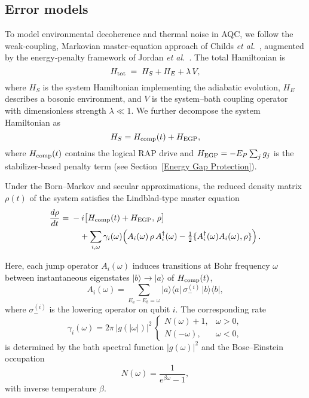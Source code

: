 \documentclass[reprint, amsmath,amssymb,nofootinbib, aps,superscriptaddress,longbibliography]{revtex4-1}
\begin{document}
\subsection{Error models}

To model environmental decoherence and thermal noise in AQC, we follow the weak‐coupling, Markovian master‐equation approach of Childs \emph{et al.}~\cite{childs2001robustness}, augmented by the energy‐penalty framework of Jordan \emph{et al.}~\cite{jordan2006error}.  The total Hamiltonian is  
\begin{equation}
H_{\rm tot} \;=\; H_S + H_E + \lambda\,V,
\end{equation}
where \(H_S\) is the system Hamiltonian implementing the adiabatic evolution, \(H_E\) describes a bosonic environment, and \(V\) is the system–bath coupling operator with dimensionless strength \(\lambda\ll1\).  We further decompose the system Hamiltonian as  
\begin{equation}
H_S = H_{\rm comp}(t) + H_{\rm EGP},
\end{equation}
where \(H_{\rm comp}(t)\) contains the logical RAP drive and \(H_{\rm EGP}=-E_P\sum_j g_j\) is the stabilizer‐based penalty term (see Section~\ref{Energy Gap Protection}).

Under the Born–Markov and secular approximations, the reduced density matrix \(\rho(t)\) of the system satisfies the Lindblad‐type master equation  
\begin{equation}\label{eq:lindblad_full}
\begin{split}
\frac{d\rho}{dt} ={}& -i\bigl[H_{\rm comp}(t)+H_{\rm EGP},\,\rho\bigr]\\
&\quad+ \sum_{i,\omega}\gamma_i(\omega)\Bigl(
A_i(\omega)\,\rho\,A_i^\dagger(\omega)
-\tfrac{1}{2}\{A_i^\dagger(\omega)A_i(\omega),\rho\}
\Bigr)\,.
\end{split}
\end{equation}

Here, each jump operator \(A_i(\omega)\) induces transitions at Bohr frequency \(\omega\) between instantaneous eigenstates \(\lvert b\rangle\to\lvert a\rangle\) of \(H_{\rm comp}(t)\),  
\begin{equation}
A_i(\omega)=\sum_{E_a - E_b = \omega}\lvert a\rangle\langle a\rvert\,\sigma_-^{(i)}\,\lvert b\rangle\langle b\rvert,
\end{equation}
where \(\sigma_-^{(i)}\) is the lowering operator on qubit \(i\).  The corresponding rate  
\begin{equation}
\gamma_i(\omega)=2\pi\,|g(\lvert\omega\rvert)|^2\,
\begin{cases}
N(\omega)+1, & \omega>0,\\
N(-\omega), & \omega<0,
\end{cases}
\end{equation}
is determined by the bath spectral function \(|g(\omega)|^2\) and the Bose–Einstein occupation  
\begin{equation}
N(\omega)=\frac{1}{e^{\beta\omega}-1},
\end{equation}
with inverse temperature \(\beta\).  
\end{document}
